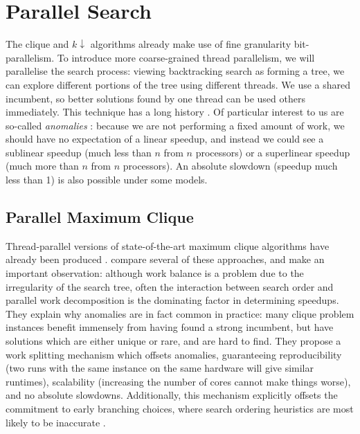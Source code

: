\documentclass[sigconf]{acmart}
\begin{document}
\section{Parallel Search}

The clique and $k{\downarrow}$ algorithms already make use of fine granularity bit-parallelism. To
introduce more coarse-grained thread parallelism, we will parallelise the search process: viewing
backtracking search as forming a tree, we can explore different portions of the tree using different
threads. We use a shared incumbent, so better solutions found by one thread can be used others
immediately. This technique has a long history \citep{o:BaderHC05}. Of particular
interest to us are so-called \emph{anomalies}
\citep{DBLP:journals/cacm/LaiS84,DBLP:journals/tc/LiW86,DBLP:conf/irregular/BruinKT95}:
because we are not performing a fixed amount of work, we should have no expectation of a linear
speedup, and instead we could see a sublinear speedup (much less than $n$ from $n$ processors) or a
superlinear speedup (much more than $n$ from $n$ processors). An absolute slowdown (speedup much
less than 1) is also possible under some models.

\subsection{Parallel Maximum Clique}

Thread-parallel versions of state-of-the-art maximum clique algorithms have already been produced
\citep{DBLP:journals/algorithms/McCreeshP13,DBLP:journals/jcisd/DepolliKRTJ13,DBLP:conf/icde/XiangGA13}.
\citet{DBLP:journals/topc/McCreeshP15} compare several of these approaches, and make an important
observation: although work balance is a problem due to the irregularity of the search tree, often
the interaction between search order and parallel work decomposition is the dominating factor in
determining speedups. They explain why anomalies are in fact common in practice: many clique problem
instances benefit immensely from having found a strong incumbent, but have solutions which are
either unique or rare, and are hard to find. They propose a work splitting mechanism which offsets
anomalies, guaranteeing reproducibility (two runs with the same instance on the same hardware will
give similar runtimes), scalability (increasing the number of cores cannot make things worse), and
no absolute slowdowns.  Additionally, this mechanism explicitly offsets the commitment to early
branching choices, where search ordering heuristics are most likely to be inaccurate
\citep{DBLP:conf/ijcai/HarveyG95,DBLP:conf/cp/ChuSS09}.
\end{document}
